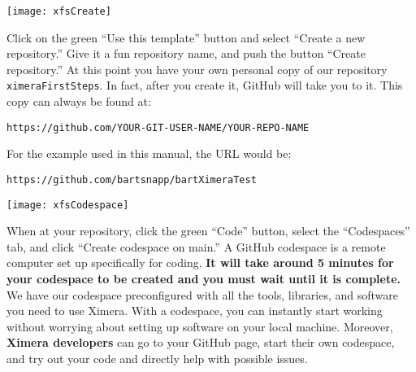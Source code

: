 \documentclass{ximera}
\begin{document}
\begin{image}
    \texttt{[image: xfsCreate]}
\end{image}
        Click on the green ``Use this template'' button and select ``Create a
        new repository.'' Give it a fun repository name, and push the button
        ``Create repository.''
        At this point you have your own personal copy of our repository
        \verb!ximeraFirstSteps!.
        In fact, after you create it, GitHub will take you to it. This copy can
        always
        be found at:
        \begin{center}
            \verb!https://github.com/YOUR-GIT-USER-NAME/YOUR-REPO-NAME!
        \end{center}
        For the example used in this manual, the URL would be: 
        \begin{center}
            \verb!https://github.com/bartsnapp/bartXimeraTest!
        \end{center}
        \newpage
        \pdfOnly{\end{multicols}}
\begin{image}
    \texttt{[image: xfsCodespace]}
\end{image}
        When at your repository, click the green ``Code'' button, select the ``Codespaces''
        tab, and click ``Create codespace on main.'' A GitHub codespace is a remote computer set up
        specifically for
        coding. \textbf{It will take
            around 5
            minutes for your codespace to be created and you must wait until it
            is
            complete.} We have our codespace preconfigured with all the tools,
        libraries, and
        software you need to use Ximera. With a codespace, you can instantly
        start
        working without worrying about setting up software on your local
        machine.
        Moreover, \textbf{Ximera developers} can go to your GitHub page, start
        their
        own codespace, and try out your code and directly help with possible issues.

        \pdfOnly{\end{multicols*}}

\newpage
\end{document}
